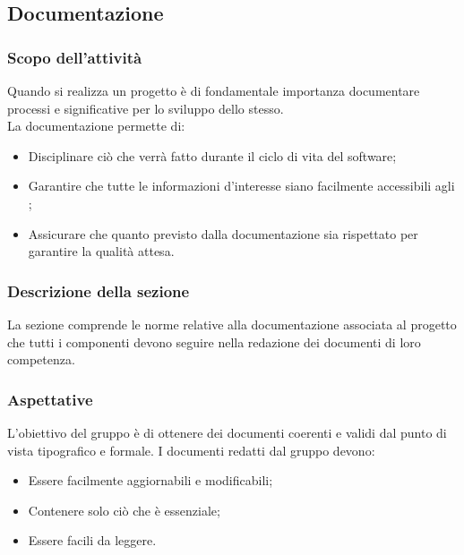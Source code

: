 \subsection{Documentazione}
\subsubsection{Scopo dell'attività} \label{PSup_Documentazione_Scopo}
Quando si realizza un progetto è di fondamentale importanza documentare processi e  significative per lo sviluppo dello stesso. \\
La documentazione permette di:
\begin{itemize}
	\item Disciplinare ciò che verrà fatto durante il ciclo di vita del software;
	\item Garantire che tutte le informazioni d'interesse siano facilmente accessibili agli ;
	\item Assicurare che quanto previsto dalla documentazione sia rispettato per garantire la qualità attesa.
\end{itemize}

\subsubsection{Descrizione della sezione} 
La sezione comprende le norme relative alla documentazione associata al progetto che tutti i componenti devono seguire nella redazione dei documenti di loro competenza.

\subsubsection{Aspettative}
L'obiettivo del gruppo è di ottenere dei documenti coerenti e validi dal punto di vista tipografico e formale.
I documenti redatti dal gruppo devono:
\begin{itemize}
	\item Essere facilmente aggiornabili e modificabili;
	\item Contenere solo ciò che è essenziale;
	\item Essere facili da leggere.
\end{itemize}

